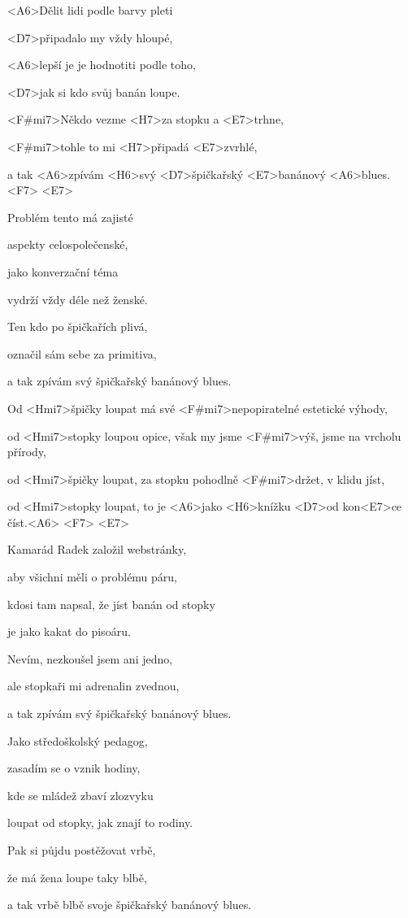 

\zs
   <A6>Dělit lidi podle barvy pleti 
   
   <D7>připadalo my vždy hloupé,
   
   <A6>lepší je je hodnotiti podle toho,

   <D7>jak si kdo svůj banán loupe.

   <F#mi7>Někdo vezme <H7>za stopku a <E7>trhne,

   <F#mi7>tohle to mi <H7>připadá <E7>zvrhlé,

   a tak <A6>zpívám <H6>svý <D7>špičkařský <E7>banánový <A6>blues. <F7> <E7>
\ks

\zs
   Problém tento má zajisté

   aspekty celospolečenské,

   jako konverzační téma

   vydrží vždy déle než ženské.

   Ten kdo po špičkařích plivá,

   označil sám sebe za primitiva,

   a tak zpívám svý špičkařský banánový blues.
\ks

\zr
   Od <Hmi7>špičky loupat má své <F#mi7>nepopiratelné estetické výhody,

   od <Hmi7>stopky loupou opice, však my jsme <F#mi7>výš, jsme na vrcholu přírody,

   od <Hmi7>špičky loupat, za stopku pohodlně <F#mi7>držet, v klidu jíst,

   od <Hmi7>stopky loupat, to je <A6>jako <H6>knížku <D7>od kon<E7>ce číst.<A6> <F7> <E7>
\kr

\zs
  Kamarád Radek založil webstránky,

   aby všichni měli o problému páru,

   kdosi tam napsal, že jíst banán od stopky

   je jako kakat do pisoáru.

   Nevím, nezkoušel jsem ani jedno,

   ale stopkaři mi adrenalin zvednou,

   a tak zpívám svý špičkařský banánový blues.
\ks

\zr
\kr   

\zs
   Jako středoškolský pedagog,

   zasadím se o vznik hodiny,

   kde se mládež zbaví zlozvyku

   loupat od stopky, jak znají to rodiny.

   Pak si půjdu postěžovat vrbě,

   že má žena loupe taky blbě,

   a tak vrbě blbě svoje špičkařský banánový blues.
\ks

\kp

